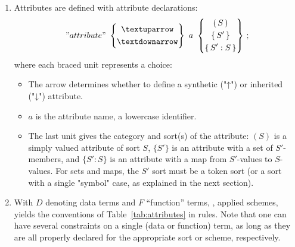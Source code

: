 \documentclass[11pt]{article} %
\begin{document}
\pagebreak[2]

\begin{notation}[attributes]\leavevmode
  \begin{enumerate}

  \item Attributes are defined with attribute declarations:
    \begin{displaymath}
      "attribute"
      ~
      \left\{
      \begin{gathered}
        {↑} \\
        {↓}
      \end{gathered}
      \right\}
      ~
      a
      ~
      \left\{
      \begin{gathered}
        (\,S\,) \\
        \{\,S'\,\} \\
        \{\,S' : S\,\}
      \end{gathered}
      \right\}
      \,;
    \end{displaymath}
    where each braced unit represents a choice:
    \begin{itemize}
    \item The arrow determines whether to define a synthetic ("↑") or inherited ("↓") attribute.
    \item $a$ is the attribute name, a lowercase identifier.
    \item The last unit gives the category and sort(s) of the attribute: $(S)$ is a simply valued
      attribute of sort $S$, $\{S'\}$ is an attribute with a set of $S'$-members, and $\{S':S\}$ is an
      attribute with a map from $S'$-values to $S$-values. For sets and maps, the $S'$ sort must be
      a token sort (or a sort with a single "symbol" case, as explained in the next section).
    \end{itemize}

  \item With $D$ denoting data terms and $F$ ``function'' terms, \ie, applied schemes, yields the
    conventions of Table~\ref{tab:attributes} in \HAX rules.  Note that one can have several
    constraints on a single (data or function) term, as long as they are all properly declared for
    the appropriate sort or scheme, respectively.

  \end{enumerate}
\end{notation}
\end{document}

